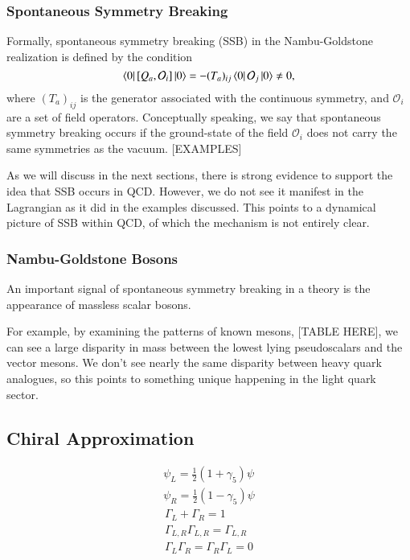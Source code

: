\documentclass[aps,prd,onecolumn,showpacs,amsmath,amssymb,nofootinbib, 11pt]{revtex4} \pdfoutput=1
\begin{document}
\subsubsection{Spontaneous Symmetry Breaking}
Formally, spontaneous symmetry breaking (SSB) in the Nambu-Goldstone realization is defined by the condition
\begin{equation}\label{eq:ssb}
    \bra{0} \left[ Q_{a},\mathcal{O}_{i}\right]\ket{0} = -(T_{a})_{ij}\bra{0}\mathcal{O}_{j}\ket{0}\neq 0,
\end{equation}
where $(T_{a})_{ij}$ is the generator associated with the continuous symmetry, and $\mathcal{O}_i$ are a set of field operators. Conceptually speaking, we say that spontaneous symmetry breaking occurs if the ground-state of the field $\mathcal{O}_{i}$ does not carry the same symmetries as the vacuum.
[EXAMPLES]

As we will discuss in the next sections, there is strong evidence to support the idea that SSB occurs in QCD. However, we do not see it manifest in the Lagrangian as it did in the examples discussed. This points to a dynamical picture of SSB within QCD, of which the mechanism is not entirely clear. 
\subsubsection{Nambu-Goldstone Bosons}
An important signal of spontaneous symmetry breaking in a theory is the appearance of massless scalar bosons.

For example, by examining the patterns of known mesons, [TABLE HERE], we can see a large disparity in mass between the lowest lying pseudoscalars and the vector mesons. 
We don't see nearly the same disparity between heavy quark analogues, so this points to something unique happening in the light quark sector.

\subsection{Chiral Approximation}

\begin{gather}\label{chiralFields}
    \psi_{L} = \frac{1}{2}(1+\gamma_{5})\psi\\
    \psi_{R} = \frac{1}{2}(1-\gamma_{5})\psi
\end{gather}
\begin{gather}\label{chiralOperators}
    \Gamma_{L} + \Gamma_{R} = 1\\
    \Gamma_{L,R}\Gamma_{L,R} = \Gamma_{L,R}\\
    \Gamma_{L}\Gamma_{R}= \Gamma_{R}\Gamma_{L} = 0
\end{gather}
\end{document}
